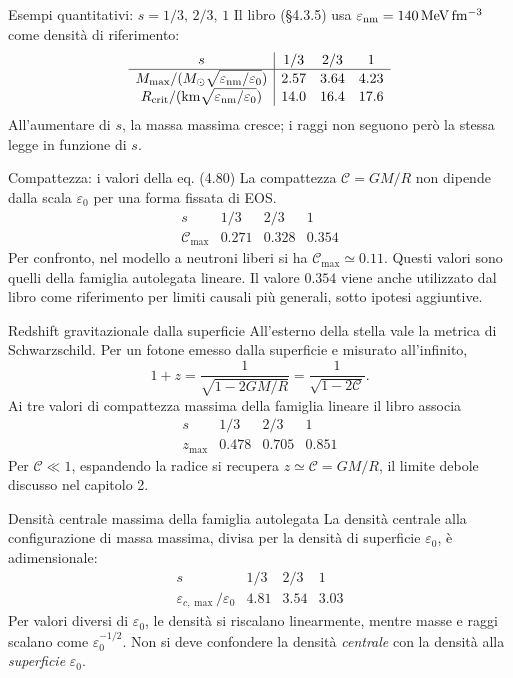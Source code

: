 \begin{frame}[t]{Esempi quantitativi: $s=1/3,\,2/3,\,1$}
\small
Il libro (§4.3.5) usa $\varepsilon_{\rm nm}=140\,\mathrm{MeV\,fm^{-3}}$ come densità di riferimento:
\[
\begin{array}{c|ccc}
s &1/3&2/3&1\\\hline
M_{\max}/(M_\odot\sqrt{\varepsilon_{\rm nm}/\varepsilon_0})
&2.57&3.64&4.23\\
R_{\rm crit}/(\mathrm{km}\sqrt{\varepsilon_{\rm nm}/\varepsilon_0})
&14.0&16.4&17.6
\end{array}
\]
All'aumentare di $s$, la massa massima cresce; i raggi non seguono però la stessa legge in funzione di $s$.
\end{frame}

\begin{frame}[t]{Compattezza: i valori della eq. (4.80)}
\small
La compattezza $\mathcal C=GM/R$ non dipende dalla scala $\varepsilon_0$ per una forma fissata di EOS.
\[
\begin{array}{c|ccc}
s&1/3&2/3&1\\\hline
\mathcal C_{\max}&0.271&0.328&0.354
\end{array}
\]
Per confronto, nel modello a neutroni liberi si ha $\mathcal C_{\max}\simeq0.11$.
\medskip
Questi valori sono quelli della famiglia autolegata lineare. Il valore $0.354$ viene anche utilizzato dal libro come riferimento per limiti causali più generali, sotto ipotesi aggiuntive.
\end{frame}

\begin{frame}[t]{Redshift gravitazionale dalla superficie}
\small
All'esterno della stella vale la metrica di Schwarzschild. Per un fotone emesso dalla superficie e misurato all'infinito,
\[
1+z=\frac{1}{\sqrt{1-2GM/R}}=\frac{1}{\sqrt{1-2\mathcal C}}.
\]
Ai tre valori di compattezza massima della famiglia lineare il libro associa
\[
\begin{array}{c|ccc}
s&1/3&2/3&1\\\hline
z_{\max}&0.478&0.705&0.851
\end{array}
\]
Per $\mathcal C\ll1$, espandendo la radice si recupera $z\simeq\mathcal C=GM/R$, il limite debole discusso nel capitolo 2.
\end{frame}

\begin{frame}[t]{Densità centrale massima della famiglia autolegata}
\small
La densità centrale alla configurazione di massa massima, divisa per la densità di superficie $\varepsilon_0$, è adimensionale:
\[
\begin{array}{c|ccc}
s&1/3&2/3&1\\\hline
\varepsilon_{c,\max}/\varepsilon_0&4.81&3.54&3.03
\end{array}
\]
Per valori diversi di $\varepsilon_0$, le densità si riscalano linearmente, mentre masse e raggi scalano come $\varepsilon_0^{-1/2}$.
\medskip
Non si deve confondere la densità \emph{centrale} con la densità alla \emph{superficie} $\varepsilon_0$.
\end{frame}

